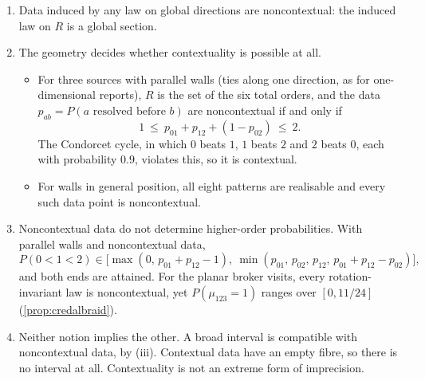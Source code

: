 \documentclass[11pt]{article}
\theoremstyle{definition}\newtheorem{definition}[theorem]{Definition}\newtheorem{remark}[theorem]{Remark}\newtheorem{example}[theorem]{Example}\newtheorem{problem}[theorem]{Open problem}\crefname{problem}{Problem}{Problems}
\begin{document}
\begin{proposition}\label{prop:imprecctx}
\begin{enumerate}
\item[(i)] Data induced by any law on global directions are noncontextual: the induced law on $R$ is a global section.
\item[(ii)] The geometry decides whether contextuality is possible at all.
\begin{itemize}
\item For three sources with parallel walls (ties along one direction, as for one-dimensional reports), $R$ is the set of the six total orders, and the data $p_{ab}=P(a\text{ resolved before }b)$ are noncontextual if and only if
\[
1\ \le\ p_{01}+p_{12}+(1-p_{02})\ \le\ 2 .
\]
The Condorcet cycle, in which $0$ beats $1$, $1$ beats $2$ and $2$ beats $0$, each with probability $0.9$, violates this, so it is contextual.
\item For walls in general position, all eight patterns are realisable and every such data point is noncontextual.
\end{itemize}
\item[(iii)] Noncontextual data do not determine higher-order probabilities. With parallel walls and noncontextual data,
\[
P(0<1<2)\in\big[\max(0,\,p_{01}+p_{12}-1),\ \min(p_{01},\,p_{02},\,p_{12},\,p_{01}+p_{12}-p_{02})\big],
\]
and both ends are attained. For the planar broker visits, every rotation-invariant law is noncontextual, yet $P(\mu_{123}=1)$ ranges over $[0,11/24]$ (\cref{prop:credalbraid}).
\item[(iv)] Neither notion implies the other. A broad interval is compatible with noncontextual data, by (iii). Contextual data have an empty fibre, so there is no interval at all. Contextuality is not an extreme form of imprecision.
\end{enumerate}
\end{proposition}
\end{document}
